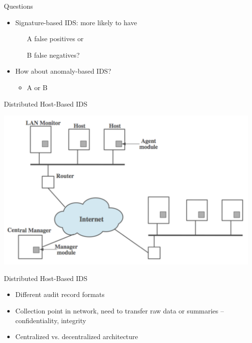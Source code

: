 \documentclass{beamer}
\begin{document}
\begin{frame}{Questions}
  \begin{itemize}
  \item Signature-based IDS: more likely to have 
    \begin{itemize}
    \item[A] false positives or 
    \item[B] false negatives? 
    \end{itemize}
  \item How about anomaly-based IDS? 
    \begin{itemize}
      \item A or B 
    \end{itemize}
  \end{itemize}
\end{frame}

\begin{frame}{Distributed Host-Based IDS}
  
  \begin{center}
    \includegraphics[width=0.9\linewidth]{distributed-host-ids}
  \end{center}
\end{frame}


\begin{frame}{Distributed Host-Based IDS }
  \begin{itemize}
  \item Different audit record formats 
  \item Collection point in network, need to transfer raw 
    data or summaries – confidentiality, integrity 
  \item Centralized vs. decentralized architecture
  \end{itemize}
\end{frame}
\end{document}
